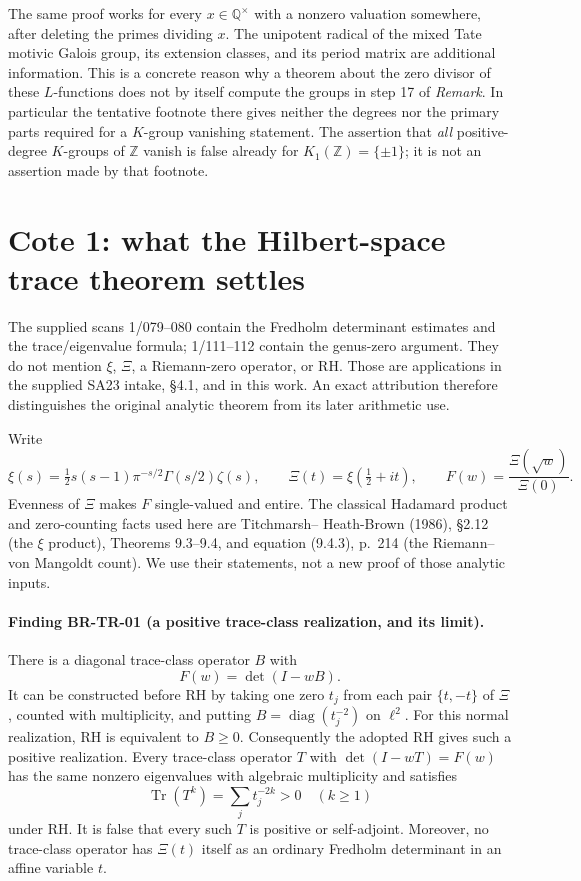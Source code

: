 \documentclass[11pt,a4paper]{article}
\theoremstyle{definition}\newtheorem{definition}[theorem]{Definition}
\theoremstyle{remark}\newtheorem{remark}[theorem]{Remark}
\begin{document}
The same proof works for every $x\in\mathbb Q^\times$ with a nonzero
valuation somewhere, after deleting the primes dividing $x$.
The unipotent radical of the mixed Tate motivic Galois group, its
extension classes, and its period matrix are additional information.
This is a concrete reason why a theorem about the zero divisor of
these $L$-functions does not by itself compute the groups in step 17
of \emph{Remark}.  In particular the tentative footnote there gives
neither the degrees nor the primary parts required for a $K$-group
vanishing statement.  The assertion that \emph{all} positive-degree
$K$-groups of $\mathbb Z$ vanish is false already for
$K_1(\mathbb Z)=\{\pm1\}$; it is not an assertion made by that footnote.

\section{Cote 1: what the Hilbert-space trace theorem settles}
\label{sec:root-trace}

The supplied scans 1/079--080 contain the Fredholm determinant estimates
and the trace/eigenvalue formula; 1/111--112 contain the genus-zero
argument.  They do not mention $\xi$, $\Xi$, a Riemann-zero operator,
or RH.  Those are applications in the supplied SA23 intake, \S4.1,
and in this work.  An exact attribution therefore distinguishes the
original analytic theorem from its later arithmetic use.

Write
\[
 \xi(s)=\tfrac12s(s-1)\pi^{-s/2}\Gamma(s/2)\zeta(s),\qquad
 \Xi(t)=\xi(\tfrac12+it),\qquad F(w)=\frac{\Xi(\sqrt w)}{\Xi(0)}.
\]
Evenness of $\Xi$ makes $F$ single-valued and entire.  The classical
Hadamard product and zero-counting facts used here are Titchmarsh--
Heath-Brown (1986), \S2.12 (the $\xi$ product), Theorems 9.3--9.4,
and equation (9.4.3), p.~214 (the Riemann--von Mangoldt count).
We use their statements, not a
new proof of those analytic inputs.

\paragraph{Finding BR-TR-01 (a positive trace-class realization, and its limit).}
There is a diagonal trace-class operator $B$ with
\[
 F(w)=\det(I-wB).
\]
It can be constructed before RH by taking one zero $t_j$ from each
pair $\{t,-t\}$ of $\Xi$, counted with multiplicity, and putting
$B=\operatorname{diag}(t_j^{-2})$ on $\ell^2$.
For this normal realization, RH is equivalent to $B\geq0$.
Consequently the adopted RH gives such a positive realization.
Every trace-class operator $T$ with $\det(I-wT)=F(w)$ has the same
nonzero eigenvalues with algebraic multiplicity and satisfies
\[
 \operatorname{Tr}(T^k)=\sum_jt_j^{-2k}>0\quad(k\geq1)
\]
under RH.  It is false that every such $T$ is positive or self-adjoint.
Moreover, no trace-class operator has $\Xi(t)$ itself as an ordinary
Fredholm determinant in an affine variable $t$.
\end{document}
